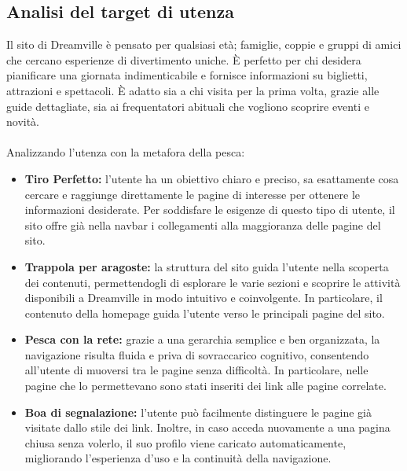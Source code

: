 \subsection{Analisi del target di utenza}
Il sito di Dreamville è pensato per qualsiasi età; famiglie, coppie e gruppi di amici che cercano esperienze di divertimento uniche. È perfetto per chi desidera pianificare una giornata indimenticabile e fornisce informazioni su biglietti, attrazioni e spettacoli. È adatto sia a chi visita per la prima volta, grazie alle guide dettagliate, sia ai frequentatori abituali che vogliono scoprire eventi e novità.
\\ \\
Analizzando l'utenza con la metafora della pesca:
\begin{itemize}
    \item \textbf{Tiro Perfetto:} l'utente ha un obiettivo chiaro e preciso, sa esattamente cosa cercare e raggiunge direttamente le pagine di interesse per ottenere le informazioni desiderate. Per soddisfare le esigenze di questo tipo di utente, il sito offre già nella navbar i collegamenti alla maggioranza delle pagine del sito.
    
    \item \textbf{Trappola per aragoste:} la struttura del sito guida l'utente nella scoperta dei contenuti, permettendogli di esplorare le varie sezioni e scoprire le attività disponibili a Dreamville in modo intuitivo e coinvolgente. In particolare, il contenuto della homepage guida l'utente verso le principali pagine del sito.
    
    \item \textbf{Pesca con la rete:} grazie a una gerarchia semplice e ben organizzata, la navigazione risulta fluida e priva di sovraccarico cognitivo, consentendo all'utente di muoversi tra le pagine senza difficoltà. In particolare, nelle pagine che lo permettevano sono stati inseriti dei link alle pagine correlate.
    
    \item \textbf{Boa di segnalazione:} l'utente può facilmente distinguere le pagine già visitate dallo stile dei link. Inoltre, in caso acceda nuovamente a una pagina chiusa senza volerlo, il suo profilo viene caricato automaticamente, migliorando l’esperienza d’uso e la continuità della navigazione.
\end{itemize}